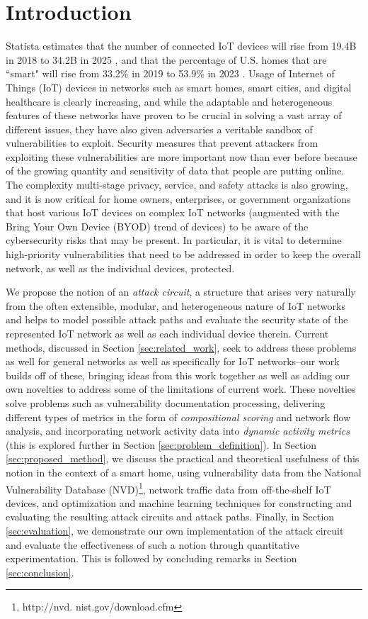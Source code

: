 \section{Introduction}

Statista estimates that the number of connected IoT devices will rise from 19.4B in 2018 to 34.2B in 2025 \cite{statista2019smart}, and that the percentage of U.S. homes that are ``smart" will rise from 33.2\% in 2019 to 53.9\% in 2023 \cite{statista2019internet}. Usage of Internet of Things (IoT) devices in networks such as smart homes, smart cities, and digital healthcare is clearly increasing, and while the adaptable and heterogeneous features of these networks have proven to be crucial in solving a vast array of different issues, they have also given adversaries a veritable sandbox of vulnerabilities to exploit. Security measures that prevent attackers from exploiting these vulnerabilities are more important now than ever before because of the growing quantity and sensitivity of data that people are putting online. The complexity multi-stage privacy, service, and safety attacks is also growing, and it is now critical for home owners, enterprises, or government organizations that host various IoT devices on complex IoT networks (augmented with the Bring Your Own Device (BYOD) trend of devices) to be aware of the cybersecurity risks that may be present. In particular, it is vital to determine high-priority vulnerabilities that need to be addressed in order to keep the overall network, as well as the individual devices, protected.

We propose the notion of an \textit{attack circuit}, a structure that arises very naturally from the often extensible, modular, and heterogeneous nature of IoT networks and helps to model possible attack paths and evaluate the security state of the represented IoT network as well as each individual device therein. Current methods, discussed in Section \ref{sec:related_work}, seek to address these problems as well for general networks as well as specifically for IoT networks--our work builds off of these, bringing ideas from this work together as well as adding our own novelties to address some of the limitations of current work. These novelties solve problems such as vulnerability documentation processing, delivering different types of metrics in the form of \textit{compositional scoring} and network flow analysis, and incorporating network activity data into \textit{dynamic activity metrics} (this is explored further in Section \ref{sec:problem_definition}). In Section \ref{sec:proposed_method}, we discuss the practical and theoretical usefulness of this notion in the context of a smart home, using vulnerability data from the National Vulnerability Database (NVD)\footnote{http://nvd.
nist.gov/download.cfm}, network traffic data from off-the-shelf IoT devices, and optimization and machine learning techniques for constructing and evaluating the resulting attack circuits and attack paths. Finally, in Section \ref{sec:evaluation}, we demonstrate our own implementation of the attack circuit and evaluate the effectiveness of such a notion through quantitative experimentation. This is followed by concluding remarks in Section \ref{sec:conclusion}.

